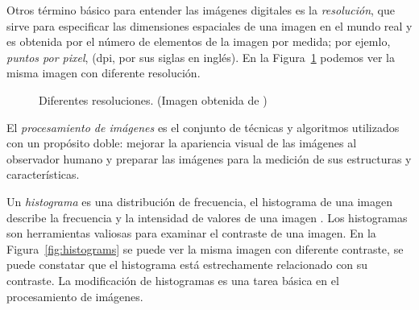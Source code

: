 Otros término básico para entender las imágenes digitales es la
\textit{resolución}, que sirve para especificar las dimensiones espaciales de
una imagen en el mundo real y es obtenida por el número de elementos de la
imagen por medida; por ejemlo, \textit{puntos por pixel}, (dpi, por sus siglas
en inglés). En la Figura~\ref{resolution} podemos ver la misma imagen con
diferente resolución.

\begin{figure}[h]
    \centering


  \caption[Resolución]{Diferentes resoluciones. (Imagen obtenida de \cite{sipi})}
  
  \label{resolution}
\end{figure}

El \textit{procesamiento de imágenes} es el conjunto de técnicas y algoritmos
utilizados con un propósito doble: mejorar la apariencia visual de las imágenes
al observador humano y preparar las imágenes para la medición de sus
estructuras y características.

Un \textit{histograma} es una distribución de frecuencia, el histograma de una
imagen describe la frecuencia y la intensidad de valores de una imagen
\cite{burger2008digital}. Los histogramas son herramientas valiosas para
examinar el contraste de una imagen. En la Figura~\ref{fig:histograms} se puede
ver la misma imagen con diferente contraste, se puede constatar que el
histograma está estrechamente relacionado con su contraste. La modificación de
histogramas es una tarea básica en el procesamiento de imágenes.

